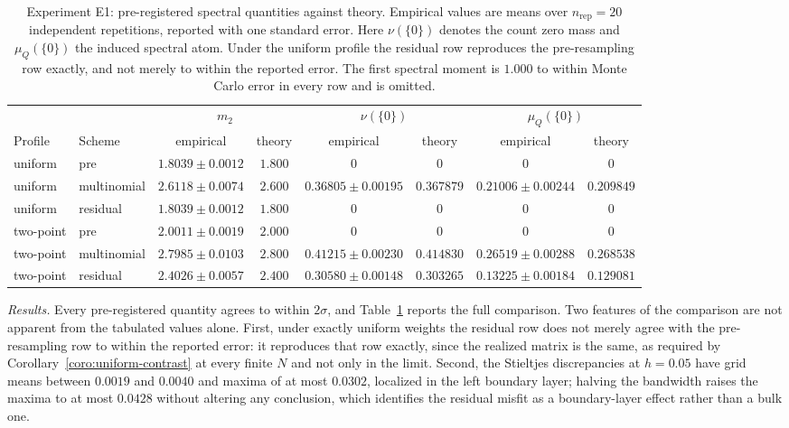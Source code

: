 \documentclass[lettersize,journal]{IEEEtran}
\theoremstyle{remark}
\begin{document}
\begin{table}[!t]
\renewcommand{\arraystretch}{1.25}
\caption{Experiment E1: pre-registered spectral quantities against theory.
  Empirical values are means over $n_{\mathrm{rep}}=20$ independent
  repetitions, reported with one standard error. Here $\nu(\{0\})$ denotes the
  count zero mass and $\mu_Q(\{0\})$ the induced spectral atom. Under the
  uniform profile the residual row reproduces the pre-resampling row exactly,
  and not merely to within the reported error. The first spectral moment is
  $1.000$ to within Monte Carlo error in every row and is omitted.}
\label{tab:e1}
\centering
\begin{tabular}{llcccccc}
\toprule
& & \multicolumn{2}{c}{$m_2$}
  & \multicolumn{2}{c}{$\nu(\{0\})$} & \multicolumn{2}{c}{$\mu_Q(\{0\})$} \\
\cmidrule(lr){3-4}\cmidrule(lr){5-6}\cmidrule(lr){7-8}
Profile & Scheme & empirical & theory & empirical & theory
        & empirical & theory \\
\midrule
uniform & pre         & $1.8039\pm0.0012$ & $1.800$
                      & $0$ & $0$ & $0$ & $0$ \\
uniform & multinomial & $2.6118\pm0.0074$ & $2.600$
                      & $0.36805\pm0.00195$ & $0.367879$
                      & $0.21006\pm0.00244$ & $0.209849$ \\
uniform & residual    & $1.8039\pm0.0012$ & $1.800$
                      & $0$ & $0$ & $0$ & $0$ \\
\addlinespace[2pt]
two-point & pre         & $2.0011\pm0.0019$ & $2.000$
                        & $0$ & $0$ & $0$ & $0$ \\
two-point & multinomial & $2.7985\pm0.0103$ & $2.800$
                        & $0.41215\pm0.00230$ & $0.414830$
                        & $0.26519\pm0.00288$ & $0.268538$ \\
two-point & residual    & $2.4026\pm0.0057$ & $2.400$
                        & $0.30580\pm0.00148$ & $0.303265$
                        & $0.13225\pm0.00184$ & $0.129081$ \\
\bottomrule
\end{tabular}
\end{table}

\emph{Results.} Every pre-registered quantity agrees to within $2\sigma$, and
Table~\ref{tab:e1} reports the full comparison. Two features of the comparison
are not apparent from the tabulated values alone. First, under exactly uniform
weights the residual row does not merely agree with the pre-resampling row to
within the reported error: it reproduces that row exactly, since the realized
matrix is the same, as required by Corollary~\ref{coro:uniform-contrast} at
every finite $N$ and not only in the limit. Second, the Stieltjes
discrepancies at $h=0.05$ have grid means between $0.0019$ and $0.0040$ and
maxima of at most $0.0302$, localized in the left boundary layer; halving the
bandwidth raises the maxima to at most $0.0428$ without altering any
conclusion, which identifies the residual misfit as a boundary-layer effect
rather than a bulk one.
\end{document}
